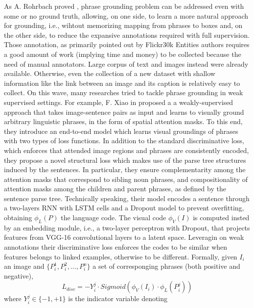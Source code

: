 As A. Rohrbach \etal{} proved \cite{rohrbach2016grounding}, phrase
grounding problem can be addressed even with some or no ground truth,
allowing, on one side, to learn a more natural approach for grounding,
i.e., wihtout memorizing mapping from phrases to boxes and, on the
other side, to reduce the expansive annotations required with full
supervision. Those annotation, as primarily pointed out by Flickr30k
Entities authors \cite{plummer2015flickr30k} requires a good amount of
work (implying time and money) to be collected because the need of
manual annotators. Large corpus of text and images instead were
already available. Otherwise, even the collection of a new dataset
with shallow information like the link between an image and its
caption is relatively easy to collect. On this wave, many researches
tried to tackle phrase grounding in weak supervised settings.  For
example, F. Xiao \etal{} in \cite{xiao2017weakly} proposed a a
weakly-supervised approach that takes image-sentence pairs as input
and learns to visually ground arbitrary linguistic phrases, in the
form of spatial attention masks. To this end, they introduce an
end-to-end model which learns visual groundings of phrases with two
types of loss functions. In addition to the standard discriminative
loss, which enforces that attended image regions and phrases are
consistently encoded, they propose a novel structural loss which makes
use of the parse tree structures induced by the sentences. In
particular, they ensure complementarity among the attention masks that
correspond to sibling noun phrases, and compositionality of attention
masks among the children and parent phrases, as defined by the
sentence parse tree. Technically speaking, their model encodes a
sentence through a two-layers RNN with LSTM cells and a Dropout model
to prevent overfitting, obtaining $\phi_L(P)$ the language code. The
visual code $\phi_V(I)$ is computed insted by an embedding module,
i.e., a two-layer perceptron with Dropout, that projects features from
VGG-16 convolutional layers to a latent space. Leveragin on weak
annotations their discriminative loss enforces the codes to be similar
when features belongs to linked examples, otherwise to be different.
Formally, given $I_i$ an image and $\{ P^1_i, P^2_i, \ldots, P^n_i \}$
a set of corresponging phrases (both positive and negative), 
\begin{equation}
  L_{disc} = -Y^j_i \cdot Sigmoid(\phi_V(I_i) \cdot \phi_L(P^j_i))
\end{equation}
where $Y^j_i \in \{ -1, +1 \}$ is the indicator variable denoting
